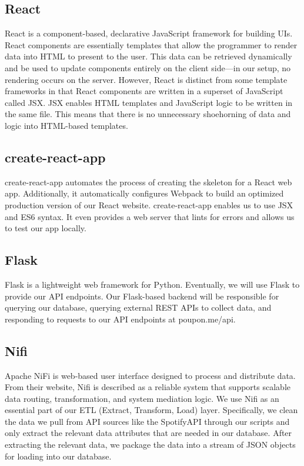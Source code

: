 \documentclass{scrartcl}
\begin{document}
\subsection{React}
React is a component-based, declarative JavaScript framework for building UIs. React components are essentially templates that allow the programmer to render data into HTML to present to the user. This data can be retrieved dynamically and be used to update components entirely on the client side—in our setup, no rendering occurs on the server. However, React is distinct from some template frameworks in that React components are written in a superset of JavaScript called JSX. JSX enables HTML templates and JavaScript logic to be written in the same file. This means that there is no unnecessary shoehorning of data and logic into HTML-based templates.

\subsection{create-react-app}
create-react-app automates the process of creating the skeleton for a React web app. Additionally, it automatically configures Webpack to build an optimized production version of our React website. create-react-app enables us to use JSX and ES6 syntax. It even provides a web server that lints for errors and allows us to test our app locally.

\subsection{Flask}
Flask is a lightweight web framework for Python. Eventually, we will use Flask to provide our API endpoints. Our Flask-based backend will be responsible for querying our database, querying external REST APIs to collect data, and responding to requests to our API endpoints at poupon.me/api.

\subsection{Nifi}
Apache NiFi is web-based user interface designed to process and distribute data. From their website, Nifi is described as a reliable system that supports scalable data routing, transformation, and system mediation logic. We use Nifi as an essential part of our ETL (Extract, Transform, Load) layer. Specifically, we clean the data we pull from API sources like the SpotifyAPI through our scripts and only extract the relevant data attributes that are needed in our database. After extracting the relevant data, we package the data into a stream of JSON objects for loading into our database.
\end{document}
